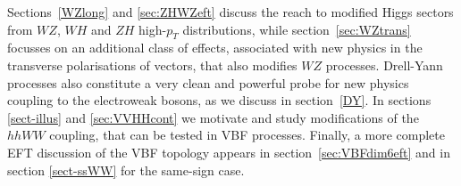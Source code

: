 Sections~\ref{WZlong} and \ref{sec:ZHWZeft} discuss the reach to modified Higgs sectors from $WZ$, $WH$ and $ZH$ high-$p_T$
distributions, while section~\ref{sec:WZtrans} focusses on an additional class of effects, associated with new physics in the transverse polarisations of vectors, that also modifies $WZ$ processes. 
Drell-Yann processes also constitute a very clean and powerful probe for new physics coupling to the electroweak bosons, as we discuss in section~\ref{DY}. In sections \ref{sect-illus} and \ref{sec:VVHHcont} we motivate and study modifications of the $hhWW$ coupling, that can be tested in VBF processes. Finally, a more complete EFT discussion of the VBF topology appears in section~\ref{sec:VBFdim6eft} and in section \ref{sect-ssWW} for the same-sign case.












